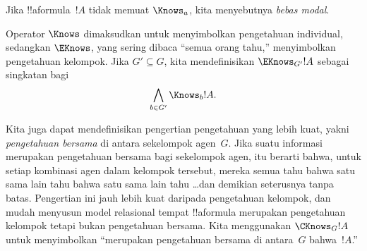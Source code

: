 \documentclass[../../../include/open-logic-section]{subfiles}
\begin{document}
Jika !!a{formula}~$!A$ tidak memuat $\Knows_a$, kita menyebutnya
\emph{bebas modal}.

\begin{defn}
  Operator $\Knows$ dimaksudkan untuk menyimbolkan pengetahuan individual,
  sedangkan $\EKnows$, yang sering dibaca ``semua orang tahu,'' menyimbolkan
  pengetahuan kelompok. Jika $G'\subseteq G$, kita mendefinisikan
  $\EKnows_{G'} !A$ sebagai singkatan bagi
  \[\bigwedge_{b \in G'} \Knows_b !A.\]
\end{defn}

Kita juga dapat mendefinisikan pengertian pengetahuan yang lebih kuat, yakni
\emph{pengetahuan bersama} di antara sekelompok agen~$G$. Jika suatu informasi
merupakan pengetahuan bersama bagi sekelompok agen, itu berarti bahwa, untuk
setiap kombinasi agen dalam kelompok tersebut, mereka semua tahu bahwa satu
sama lain tahu bahwa satu sama lain tahu \dots dan demikian seterusnya tanpa
batas. Pengertian ini jauh lebih kuat daripada pengetahuan kelompok, dan
mudah menyusun model relasional tempat !!a{formula} merupakan pengetahuan
kelompok tetapi bukan pengetahuan bersama. Kita menggunakan $\CKnows_G !A$
untuk menyimbolkan ``merupakan pengetahuan bersama di antara~$G$
bahwa~$!A$.''
\end{document}
